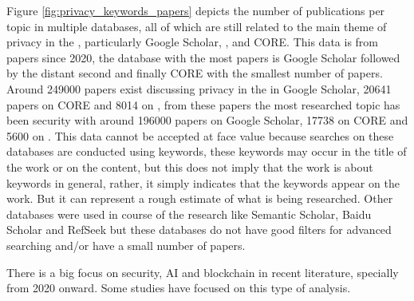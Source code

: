 Figure \ref{fig:privacy_keywords_papers} depicts the number of publications
per topic in multiple databases, all of which are still related to the main
theme of privacy in the \hyperlink{\acronym}{\acronym}, particularly Google Scholar, \hyperlink{\acronym}{\acronym}, and CORE. This
data is from papers since 2020, the database with the most papers is Google Scholar
followed by the distant second \hyperlink{\acronym}{\acronym} and finally
CORE with the smallest number of papers. Around 249000 papers exist discussing privacy
in the \hyperlink{\acronym}{\acronym} in Google Scholar, 20641 papers on CORE and 8014 on \hyperlink{\acronym}{\acronym}, from these papers
the most researched topic has been security with around 196000 papers on Google Scholar,
17738 on CORE and 5600 on \hyperlink{\acronym}{\acronym}. This data cannot be accepted at face value because
searches on these databases are conducted using keywords, these keywords may occur
in the title of the work or on the content, but this does not imply that the work
is about keywords in general, rather, it simply indicates that the keywords appear
on the work. But it can represent a rough estimate of what is being researched.
Other databases were used in course of the research like Semantic Scholar,
Baidu Scholar and RefSeek but these databases do not have good
filters for advanced searching and/or have a small number of papers.

There is a big focus on security, AI and blockchain in recent literature,
specially from 2020 onward. Some studies \cite{dadkhah2020publications, duygu2023analysis} have
focused on this type of analysis.

